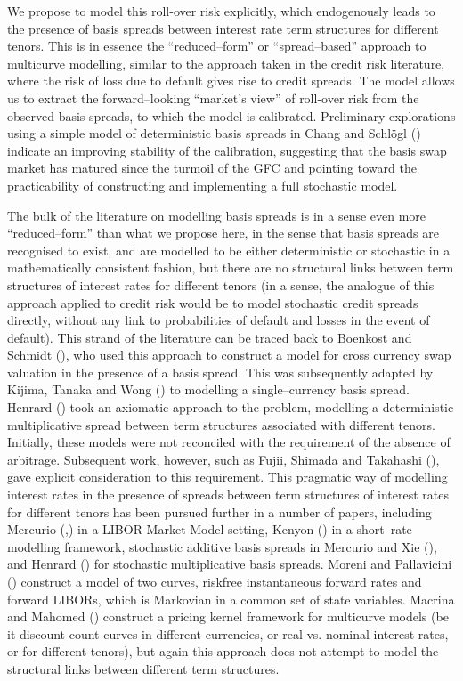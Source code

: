 \documentclass[12pt,a4paper]{article}
\theoremstyle{plain}
\numberwithin{equation}{section}
\begin{document}
We propose to model this roll-over risk explicitly, which endogenously leads to the presence of basis spreads between interest rate term structures for different tenors. This is in essence the ``reduced--form'' or ``spread--based'' approach to multicurve modelling, similar to the approach taken in the credit risk literature, where the risk of loss due to default gives rise to credit spreads. The model allows us to extract the forward--looking ``market's view'' of roll-over risk from the observed basis spreads, to which the model is calibrated. Preliminary explorations using a simple model of deterministic basis spreads in Chang and Schl\"ogl (\citeyear*{ChaSch:2015}) indicate an improving stability of the calibration, suggesting that the basis swap market has matured since the turmoil of the GFC and pointing toward the practicability of constructing and implementing a full stochastic model.

The bulk of the literature on modelling basis spreads is in a sense even more ``reduced--form'' than what we propose here, in the sense that basis spreads are recognised to exist, and are modelled to be either deterministic or stochastic in a mathematically consistent fashion, but there are no structural links between term structures of interest rates for different tenors (in a sense, the analogue of this approach applied to credit risk would be to model stochastic credit spreads directly, without any link to probabilities of default and losses in the event of default). This strand of the literature can be traced back to Boenkost and Schmidt (\citeyear*{BoeSch:2004}), who used this approach to construct a model for cross currency swap valuation in the presence of a basis spread. This was subsequently adapted by Kijima, Tanaka and Wong (\citeyear*{KijTanWon:2009}) to modelling a single--currency basis spread. Henrard (\citeyear*{Henrard:2010}) took an axiomatic approach to the problem, modelling a deterministic multiplicative spread between term structures associated with different tenors. Initially, these models were not reconciled with the requirement of the absence of arbitrage. Subsequent work, however, such as Fujii, Shimada and Takahashi (\citeyear*{FujShiTak:2009}), gave explicit consideration to this requirement. This pragmatic way of modelling interest rates in the presence of spreads between term structures of interest rates for different tenors has been pursued further in a number of papers, including Mercurio (\citeyear*{Mercurio:2009},\citeyear*{Mercurio2010}) in a LIBOR Market Model setting, Kenyon (\citeyear*{Kenyon:2010}) in a short--rate modelling framework, stochastic additive basis spreads in Mercurio and Xie (\citeyear*{MerXie:2012}), and Henrard (\citeyear*{Henrard:2013}) for stochastic multiplicative basis spreads. Moreni and Pallavicini (\citeyear*{MorPal:2014}) construct a model of two curves, riskfree instantaneous forward rates and forward LIBORs, which is Markovian in a common set of state variables. Macrina and Mahomed (\citeyear*{risks6010018}) construct a pricing kernel framework for multicurve models (be it discount count curves in different currencies, or real vs. nominal interest rates, or for different tenors), but again this approach does not attempt to model the structural links between different term structures.
\end{document}
